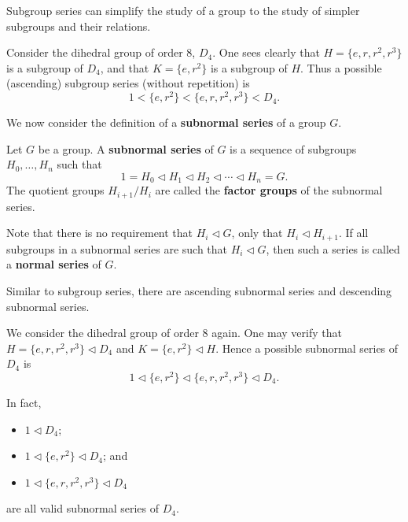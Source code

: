 Subgroup series can simplify the study of a group to the study of simpler subgroups and their relations.

\begin{example}
    Consider the dihedral group of order 8, $D_4$. One sees clearly that $H = \{e, r, r^2, r^3\}$ is a subgroup of $D_4$, and that $K = \{e, r^2\}$ is a subgroup of $H$. Thus a possible (ascending) subgroup series (without repetition) is
    \[
        1 < \{e, r^2\} < \{e, r, r^2, r^3\} < D_4.
    \]
\end{example}

We now consider the definition of a \textbf{subnormal series} of a group $G$.
\begin{definition}
    Let $G$ be a group. A \textbf{subnormal series} of $G$ is a sequence of subgroups $H_0, \dots, H_n$ such that
    \[
        1 = H_0 \lhd H_1 \lhd H_2 \lhd \cdots \lhd H_n = G.    
    \]
    The quotient groups $H_{i+1}/H_i$ are called the \textbf{factor groups} of the subnormal series.
\end{definition}
\begin{remark}
    Note that there is no requirement that $H_i \lhd G$, only that $H_i \lhd H_{i+1}$. If all subgroups in a subnormal series are such that $H_i \lhd G$, then such a series is called a \textbf{normal series} of $G$.
\end{remark}
\begin{remark}
    Similar to subgroup series, there are ascending subnormal series and descending subnormal series.
\end{remark}

\begin{example}
    We consider the dihedral group of order 8 again. One may verify that $H = \{e, r, r^2, r^3\} \lhd D_4$ and $K = \{e, r^2\} \lhd H$. Hence a possible subnormal series of $D_4$ is
    \[
        1 \lhd \{e, r^2\} \lhd \{e, r, r^2, r^3\} \lhd D_4.
    \]

    \newpage

    In fact,
    \begin{itemize}
        \item $1 \lhd D_4$;
        \item $1 \lhd \{e, r^2\} \lhd D_4$; and
        \item $1 \lhd \{e, r, r^2, r^3\} \lhd D_4$
    \end{itemize}
    are all valid subnormal series of $D_4$.
\end{example}

